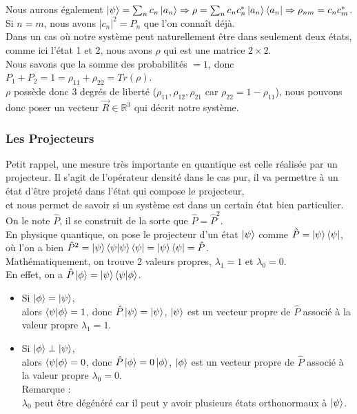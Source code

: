 \documentclass[11pt]{article}
\begin{document}
Nous aurons également $\ket{\psi} = \sum_n c_n\ket{a_n} \Rightarrow \rho = \sum_n c_n c_n^\ast \ket{a_n}\bra{a_n} \Rightarrow \rho_{nm} = c_n c_m^\ast$. \\
Si $n=m$, nous avons $|c_n|^2 = P_n$ que l'on connaît déjà.\\
\vspace{0.2cm}
Dans un cas où notre système peut naturellement être dans seulement deux états, comme ici l'état 1 et 2, nous avons $\rho$ qui est une matrice $2 \times 2$. \\
\vspace{0.2cm}
Nous savons que la somme des probabilités $= 1$, donc $P_1 + P_2 = 1 = \rho_{11} + \rho_{22} = Tr(\rho)$. \\
$\rho$ possède donc 3 degrés de liberté ($\rho_{11},\rho_{12},\rho_{21}$ car $\rho_{22} = 1 - \rho_{11}$), nous pouvons donc poser un vecteur $\Vec{R} \in \mathbb{R}^3$ qui décrit notre système.


\newpage

\subsubsection{{Les Projecteurs\texttt{}} \label{sec:Projecteur} }
\qquad Petit rappel, une mesure très importante en quantique est celle réalisée par un projecteur. Il s'agit de l'opérateur densité dans le cas pur, il va permettre à un état d'être projeté dans l'état qui compose le projecteur, \\
et nous permet de savoir si un système est dans un certain état bien particulier. \\
On le note $\hat P$, il se construit de la sorte que $\hat P = \hat P^2$.\\
En physique quantique, on pose le projecteur d'un état $\ket{\psi}$ comme $\hat P = \ket{\psi}\bra{\psi}$, \\
où l'on a bien $\hat P^2 = \ket{\psi}\braket{\psi|\psi}\bra{\psi} = \ket{\psi}\bra{\psi} = \hat P $.\\
\vspace{0.2cm}
Mathématiquement, on trouve 2 valeurs propres, $\lambda_1 = 1$ et $\lambda_0 = 0$. \\
\vspace{0.2cm}
En effet, on a $\hat P \ket{\phi} = \ket{\psi}\braket{\psi|\phi}$. 
\begin{itemize}
    \renewcommand{\labelitemi}{$\cdot$}
        \item Si $\ket{\phi} = \ket{\psi}$, \\
        alors $\braket{\psi|\phi} = 1$, donc $\hat P \ket{\psi} =\ket{\psi}$, $\ket{\psi}$ est un vecteur propre de $\hat P$ associé à la valeur propre $\lambda_1 = 1$.
        \item Si $\ket{\phi} \perp \ket{\psi}$,\\ 
        alors $\braket{\psi|\phi} = 0$, donc $\hat P \ket{\phi} = 0 \ket{\phi}$, $\ket{\phi}$ est un vecteur propre de $\hat P$ associé à la valeur propre $\lambda_0 = 0$. \\
        Remarque : \\
        $\lambda_0$ peut être dégénéré car il peut y avoir plusieurs états orthonormaux à $\ket{\psi}$.
    \end{itemize}
    
\end{document}
